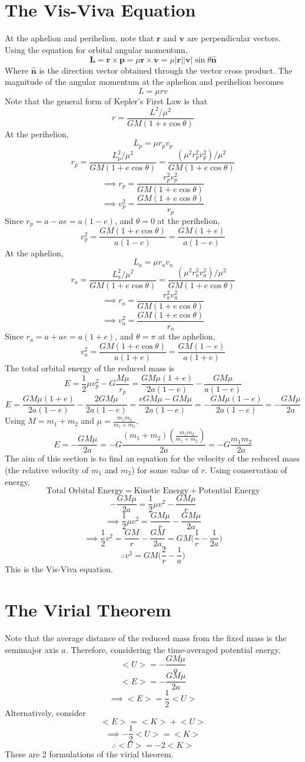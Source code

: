 \documentclass{article}
\begin{document}
\section{The Vis-Viva Equation}
At the aphelion and perihelion, note that $\textbf{r}$ and $\textbf{v}$ are perpendicular vectors. Using the equation for orbital angular momentum,
$$\textbf{L}=\textbf{r}\times\textbf{p}=\mu\textbf{r}\times\textbf{v}=\mu|\textbf{r}||\textbf{v}|\sin{\theta}\bm{\hat{n}}$$
Where $\bm{\hat{n}}$ is the direction vector obtained through the vector cross product. The magnitude of the angular momentum at the aphelion and perihelion becomes
$$L=\mu rv$$
Note that the general form of Kepler's First Law is that
$$r=\frac{L^2/\mu^2}{GM(1+e\cos{\theta})}$$
At the perihelion, 
$$L_p=\mu r_pv_p$$
$$r_p=\frac{L_p^2/\mu^2}{GM(1+e\cos{\theta})}=\frac{(\mu^2r_p^2v_p^2)/\mu^2}{GM(1+e\cos{\theta})}$$
$$\implies r_p=\frac{r_p^2v_p^2}{GM(1+e\cos{\theta})}$$
$$\implies v_p^2=\frac{GM(1+e\cos{\theta})}{r_p}$$
Since $r_p=a-ae=a(1-e)$, and $\theta=0$ at the perihelion,
$$v_p^2=\frac{GM(1+e\cos{\theta})}{a(1-e)}=\frac{GM(1+e)}{a(1-e)}$$
At the aphelion,
$$L_a=\mu r_av_a$$
$$r_a=\frac{L_a^2/\mu^2}{GM(1+e\cos{\theta})}=\frac{(\mu^2r_a^2v_a^2)/\mu^2}{GM(1+e\cos{\theta})}$$
$$\implies r_a=\frac{r_a^2v_a^2}{GM(1+e\cos{\theta})}$$
$$\implies v_a^2=\frac{GM(1+e\cos{\theta})}{r_a}$$
Since $r_a=a+ae=a(1+e)$, and $\theta=\pi$ at the aphelion,
$$v_a^2=\frac{GM(1+e\cos{\theta})}{a(1+e)}=\frac{GM(1-e)}{a(1+e)}$$
The total orbital energy of the reduced mass is
$$E=\frac{1}{2}\mu v_p^2-G\frac{M\mu}{r_p}=\frac{GM\mu(1+e)}{2a(1-e)}-\frac{GM\mu}{a(1-e)}$$
$$E=\frac{GM\mu (1+e)}{2a(1-e)}-\frac{2GM\mu}{2a(1-e)}=\frac{eGM\mu-GM\mu}{2a(1-e)}=-\frac{GM\mu(1-e)}{2a(1-e)}=-\frac{GM\mu}{2a}$$
Using $M=m_1+m_2$ and $\mu=\frac{m_1m_2}{m_1+m_2}$,
$$E=-\frac{GM\mu}{2a}=-G\frac{(m_1+m_2)(\frac{m_1m_2}{m_1+m_2})}{2a}=-G\frac{m_1m_2}{2a}$$
The aim of this section is to find an equation for the velocity of the reduced mass (the relative velocity of $m_1$ and $m_2$) for some value of $r$. Using conservation of energy,
$$\text{Total Orbital Energy}=\text{Kinetic Energy}+\text{Potential Energy}$$
$$-\frac{GM\mu}{2a}=\frac{1}{2}\mu v^2-\frac{GM\mu}{r}$$
$$\implies\frac{1}{2}\mu v^2=\frac{GM\mu}{r}-\frac{GM\mu}{2a}$$
$$\implies \frac{1}{2}v^2=\frac{GM}{r}-\frac{GM}{2a}=GM\Bigg(\frac{1}{r}-\frac{1}{2a}\Bigg)$$
$$\therefore v^2=GM\Bigg(\frac{2}{r}-\frac{1}{a}\Bigg)$$
This is the Vis-Viva equation.
\section{The Virial Theorem}
Note that the average distance of the reduced mass from the fixed mass is the semimajor axis $a$. Therefore, considering the time-averaged potential energy,
$$\Big<U\Big>=-\frac{GM\mu}{a}$$
$$\Big<E\Big>=-\frac{GM\mu}{2a}$$
$$\implies \Big<E\Big>=\frac{1}{2}\Big<U\Big>$$
Alternatively, consider
$$\Big<E\Big>=\Big<K\Big>+\Big<U\Big>$$
$$\implies-\frac{1}{2}\Big<U\Big>=\Big<K\Big>$$
$$\therefore\Big<U\Big>=-2\Big<K\Big>$$
These are 2 formulations of the virial theorem.
\end{document}
